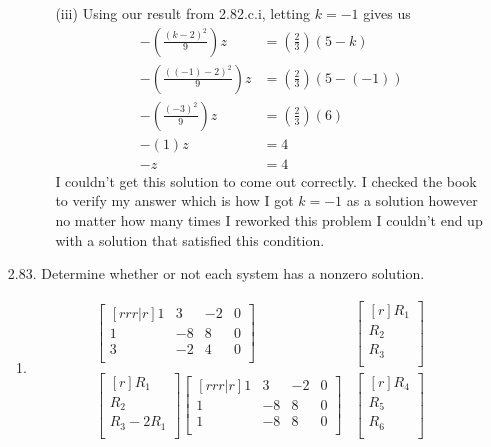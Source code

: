 \documentclass[12pt]{article}
\begin{document}
\begin{enumerate}
\begin{enumerate}
\begin{enumerate}
		\item [(iii)]
		Using our result from 2.82.c.i, letting $k = -1$ gives us
		\begin{align*}
		-(\frac{(k-2)^2}{9})z &= (\frac{2}{3})(5-k)\\
		-(\frac{((-1)-2)^2}{9})z &= (\frac{2}{3})(5-(-1))\\
		-(\frac{(-3)^2}{9})z &= (\frac{2}{3})(6)\\
		-(1)z &= 4\\
		-z &= 4
		\end{align*}
		I couldn't get this solution to come out correctly. I checked the book to verify my answer which is how I got $k=-1$ as a solution however no matter how many times I reworked this problem I couldn't end up with a solution that satisfied this condition.
		\end{enumerate}
	\end{enumerate}
\medskip
\item [2.83.] Determine whether or not each system has a nonzero solution.
	\begin{enumerate}
	\item
	\begin{align*}
	\begin{bmatrix}[rrr|r]
	1 & 3 & -2 & 0\\
	1 & -8 & 8 & 0\\
	3 & -2 & 4 & 0\\
	\end{bmatrix}&
	\begin{bmatrix}[r]
	R_1\\ R_2\\ R_3\\
	\end{bmatrix}\\
	\begin{bmatrix}[r]
	R_1\\
	R_2\\
	R_3 - 2R_1\\
	\end{bmatrix}
	\begin{bmatrix}[rrr|r]
	1 & 3 & -2 & 0\\
	1 & -8 & 8 & 0\\
	1 & -8 & 8 & 0\\
	\end{bmatrix}&
	\begin{bmatrix}[r]
	R_4\\ R_5\\ R_6\\

\end{bmatrix}
\end{align*}
\end{enumerate}
\end{enumerate}
\end{document}
